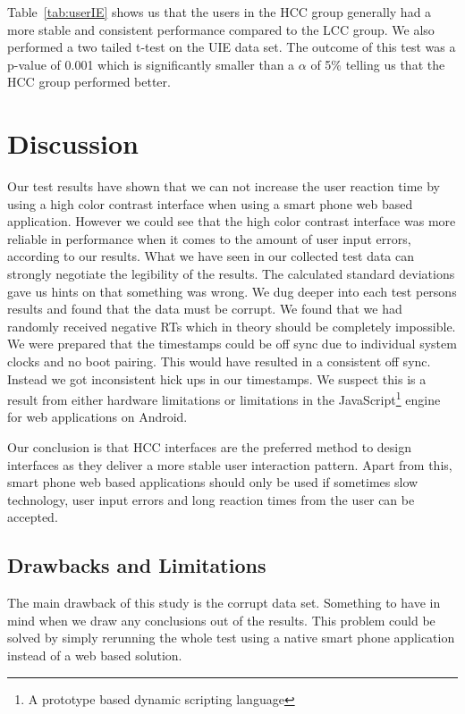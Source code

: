 \documentclass[runningheads,a4paper]{llncs}
\begin{document}
Table~\ref{tab:userIE} shows us that the users in the HCC group generally had a more stable and consistent performance compared to the LCC group. We also performed a two tailed t-test on the UIE data set. The outcome of this test was a p-value of 0.001 which is significantly smaller than a $\alpha$ of 5\% telling us that the HCC group performed better.

\section{Discussion}\label{sec:discussion}
Our test results have shown that we can not increase the user reaction time by using a high color contrast interface when using a smart phone web based application. However we could see that the high color contrast interface was more reliable in performance when it comes to the amount of user input errors, according to our results. What we have seen in our collected test data can strongly negotiate the legibility of the results. The calculated standard deviations gave us hints on that something was wrong. We dug deeper into each test persons results and found that the data must be corrupt. We found that we had randomly received negative RTs which in theory should be completely impossible. We were prepared that the timestamps could be off sync due to individual system clocks and no boot pairing. This would have resulted in a consistent off sync. Instead we got inconsistent hick ups in our timestamps. We suspect this is a result from either hardware limitations or limitations in the JavaScript\footnote{A prototype based dynamic scripting language} engine for web applications on Android.

Our conclusion is that HCC interfaces are the preferred method to design interfaces as they deliver a more stable user interaction pattern. Apart from this, smart phone web based applications should only be used if sometimes slow technology, user input errors and long reaction times from the user can be accepted.

\subsection{Drawbacks and Limitations}\label{subsec:drawbacks}
The main drawback of this study is the corrupt data set. Something to have in mind when we draw any conclusions out of the results. This problem could be solved by simply rerunning the whole test using a native smart phone application instead of a web based solution.
\end{document}
